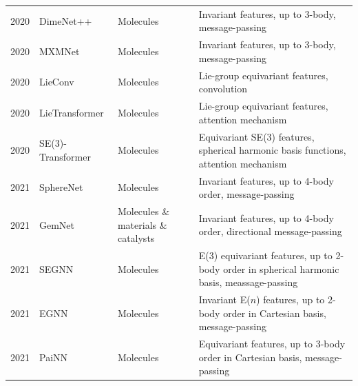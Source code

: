\begin{longtable}{p{1.25cm}p{2.5cm}p{3cm}p{10.25cm}}

\footnotesize{2020} &
\footnotesize{DimeNet++\cite{gasteiger2020fast}} &
\footnotesize{Molecules} &
\footnotesize{Invariant features, up to 3-body, message-passing}\\

\footnotesize{2020} &
\footnotesize{MXMNet\cite{zhang2020molecular}} &
\footnotesize{Molecules} &
\footnotesize{Invariant features, up to 3-body, message-passing}\\

\footnotesize{2020} &
\footnotesize{LieConv\cite{finzi2020generalizing}} &
\footnotesize{Molecules} &
\footnotesize{Lie-group equivariant features, convolution}\\

\footnotesize{2020} &
\footnotesize{LieTransformer\cite{hutchinson2021lietransformer}} &
\footnotesize{Molecules} &
\footnotesize{Lie-group equivariant features, attention mechanism\cite{vaswani2017attention}}\\

\footnotesize{2020} &
\footnotesize{SE(3)-Transformer\cite{fuchs2020se}} &
\footnotesize{Molecules} &
\footnotesize{Equivariant SE(3) features, spherical harmonic basis functions, attention mechanism}\\

\footnotesize{2021} &
\footnotesize{SphereNet\cite{liu2022spherical}} &
\footnotesize{Molecules} &
\footnotesize{Invariant features, up to 4-body order, message-passing}\\

\footnotesize{2021} &
\footnotesize{GemNet\cite{gasteiger2021gemnet}} &
\footnotesize{Molecules \& materials \& catalysts} &
\footnotesize{Invariant features, up to 4-body order, directional message-passing}\\

\footnotesize{2021} &
\footnotesize{SEGNN\cite{brandstetter2021geometric}} &
\footnotesize{Molecules} &
\footnotesize{E(3) equivariant features, up to 2-body order in spherical harmonic basis, meassage-passing}\\

\footnotesize{2021} &
\footnotesize{EGNN\cite{satorras2021n}} &
\footnotesize{Molecules} &
\footnotesize{Invariant E($n$) features, up to 2-body order in Cartesian basis, message-passing}\\

\footnotesize{2021} &
\footnotesize{PaiNN\cite{schutt2021equivariant}} &
\footnotesize{Molecules} &
\footnotesize{Equivariant features, up to 3-body order in Cartesian basis, message-passing}\\


\end{longtable}

